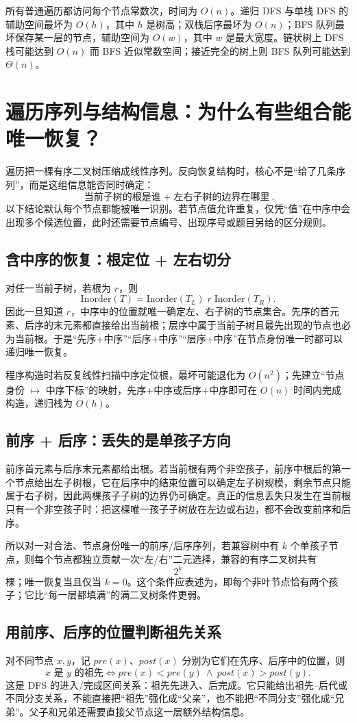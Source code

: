 \documentclass[UTF8,fontset=none,11pt,a4paper]{ctexart}
\begin{document}
所有普通遍历都访问每个节点常数次，时间为 $O(n)$。递归 DFS 与单栈 DFS 的辅助空间最坏为 $O(h)$，其中 $h$ 是树高；双栈后序最坏为 $O(n)$；BFS 队列最坏保存某一层的节点，辅助空间为 $O(w)$，其中 $w$ 是最大宽度。链状树上 DFS 栈可能达到 $O(n)$ 而 BFS 近似常数空间；接近完全的树上则 BFS 队列可能达到 $\Theta(n)$。

\section{遍历序列与结构信息：为什么有些组合能唯一恢复？}
遍历把一棵有序二叉树压缩成线性序列。反向恢复结构时，核心不是“给了几条序列”，而是这组信息能否同时确定：
\[
\boxed{\text{当前子树的根是谁}\; +\; \text{左右子树的边界在哪里}}.
\]
以下结论默认每个节点都能被唯一识别。若节点值允许重复，仅凭“值”在中序中会出现多个候选位置，此时还需要节点编号、出现序号或题目另给的区分规则。

\subsection{含中序的恢复：根定位 + 左右切分}
对任一当前子树，若根为 $r$，则
\[
\text{Inorder}(T)=\text{Inorder}(T_L)\;r\;\text{Inorder}(T_R).
\]
因此一旦知道 $r$，中序中的位置就唯一确定左、右子树的节点集合。先序的首元素、后序的末元素都直接给出当前根；层序中属于当前子树且最先出现的节点也必为当前根。于是“先序+中序”“后序+中序”“层序+中序”在节点身份唯一时都可以递归唯一恢复。

程序构造时若反复线性扫描中序定位根，最坏可能退化为 $O(n^2)$；先建立“节点身份 $\mapsto$ 中序下标”的映射，先序+中序或后序+中序即可在 $O(n)$ 时间内完成构造，递归栈为 $O(h)$。

\subsection{前序 + 后序：丢失的是单孩子方向}
前序首元素与后序末元素都给出根。若当前根有两个非空孩子，前序中根后的第一个节点给出左子树根，它在后序中的结束位置可以确定左子树规模，剩余节点只能属于右子树，因此两棵孩子子树的边界仍可确定。真正的信息丢失只发生在当前根只有一个非空孩子时：把这棵唯一孩子子树放在左边或右边，都不会改变前序和后序。

所以对一对合法、节点身份唯一的前序/后序序列，若兼容树中有 $k$ 个单孩子节点，则每个节点都独立贡献一次“左/右”二元选择，兼容的有序二叉树共有
\[
\boxed{2^k}
\]
棵；唯一恢复当且仅当 $k=0$。这个条件应表述为，即每个非叶节点恰有两个孩子；它比“每一层都填满”的满二叉树条件更弱。

\subsection{用前序、后序的位置判断祖先关系}
对不同节点 $x,y$，记 $pre(x)$、$post(x)$ 分别为它们在先序、后序中的位置，则
\[
\boxed{x\text{ 是 }y\text{ 的祖先}\iff pre(x)<pre(y)\ \land\ post(x)>post(y)}.
\]
这是 DFS 的进入/完成区间关系：祖先先进入、后完成。它只能给出祖先--后代或不同分支关系，不能直接把“祖先”强化成“父亲”，也不能把“不同分支”强化成“兄弟”。父子和兄弟还需要直接父节点这一层额外结构信息。
\end{document}
